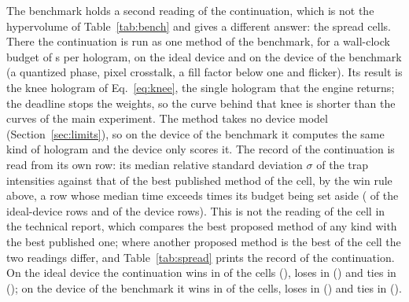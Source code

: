 The benchmark holds a second reading of the continuation, which is not the hypervolume of Table~\ref{tab:bench} and gives a different answer: the spread cells. There the continuation is run as one method of the benchmark, for a wall-clock budget of \spreadBudget{} s per hologram, on the ideal device and on the device of the benchmark (a quantized phase, pixel crosstalk, a fill factor below one and flicker). Its result is the knee hologram of Eq.~\ref{eq:knee}, the single hologram that the engine returns; the deadline stops the weights, so the curve behind that knee is shorter than the curves of the main experiment. The method takes no device model (Section~\ref{sec:limits}), so on the device of the benchmark it computes the same kind of hologram and the device only scores it. The record of the continuation is read from its own row: its median relative standard deviation $\sigma$ of the trap intensities against that of the best published method of the cell, by the win rule above, a row whose median time exceeds \spreadOverFactor{} times its budget being set aside (\spreadOverN{} of the \spreadCells{} ideal-device rows and \spreadDevOverN{} of the \spreadDevCells{} device rows). This is not the reading of the cell in the technical report, which compares the best proposed method of any kind with the best published one; where another proposed method is the best of the cell the two readings differ, and Table~\ref{tab:spread} prints the record of the continuation. On the ideal device the continuation wins in \spreadWins{} of the \spreadCells{} cells (\spreadWinList{}), loses in \spreadLosses{} (\spreadLossList{}) and ties in \spreadTies{} (\spreadTieList{}); on the device of the benchmark it wins in \spreadDevWins{} of the \spreadDevCells{} cells, loses in \spreadDevLosses{} (\spreadDevLossList{}) and ties in \spreadDevTies{} (\spreadDevTieList{}).


